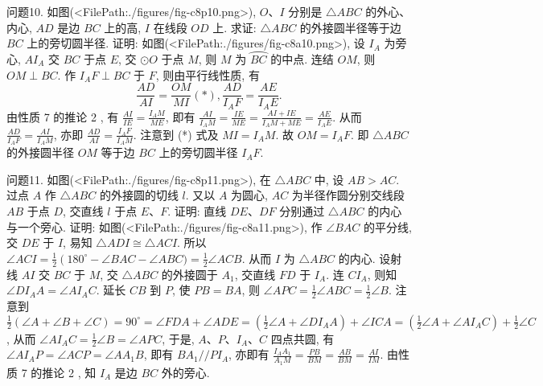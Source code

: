 问题10. 如图(<FilePath:./figures/fig-c8p10.png>), $O 、 I$ 分别是 $\triangle A B C$ 的外心、内心, $A D$ 是边 $B C$ 上的高, $I$ 在线段 $O D$ 上.
求证: $\triangle A B C$ 的外接圆半径等于边 $B C$ 上的旁切圆半径.
证明: 如图(<FilePath:./figures/fig-c8a10.png>), 设 $I_A$ 为旁心, $A I_A$ 交 $B C$ 于点 $E$, 交 $\odot O$ 于点 $M$, 则 $M$ 为 $\overparen{B C}$ 的中点.
连结 $O M$, 则 $O M \perp B C$. 作 $I_A F \perp B C$ 于 $F$, 则由平行线性质, 有
$$
\frac{A D}{A I}=\frac{O M}{M I}(*), \frac{A D}{I_A F}=\frac{A E}{I_A E} .
$$
由性质 7 的推论 2 , 有 $\frac{A I}{I E}=\frac{I_A M}{M E}$, 即有 $\frac{A I}{I_A M}=\frac{I E}{M E}= \frac{A I+I E}{I_A M+M E}=\frac{A E}{I_A E}$. 从而 $\frac{A D}{I_A F}=\frac{A I}{I_A M}$, 亦即 $\frac{A D}{A I}=\frac{I_A F}{I_A M}$. 
注意到 (*) 式及 $M I=I_A M$. 故 $O M=I_A F$. 即 $\triangle A B C$ 的外接圆半径 $O M$ 等于边 $B C$ 上的旁切圆半径 $I_A F$.



问题11. 如图(<FilePath:./figures/fig-c8p11.png>), 在 $\triangle A B C$ 中, 设 $A B>A C$. 过点 $A$ 作 $\triangle A B C$ 的外接圆的切线 $l$. 又以 $A$ 为圆心, $A C$ 为半径作圆分别交线段 $A B$ 于点 $D$, 交直线 $l$ 于点 $E 、 F$. 证明: 直线 $D E 、 D F$ 分别通过 $\triangle A B C$ 的内心与一个旁心.
证明: 如图(<FilePath:./figures/fig-c8a11.png>), 作 $\angle B A C$ 的平分线, 交 $D E$ 于 $I$, 易知 $\triangle A D I \cong \triangle A C I$. 所以 $\angle A C I=\frac{1}{2}\left(180^{\circ}-\angle B A C-\right. \angle A B C)=\frac{1}{2} \angle A C B$. 从而 $I$ 为 $\triangle A B C$ 的内心.
设射线 $A I$ 交 $B C$ 于 $M$, 交 $\triangle A B C$ 的外接圆于 $A_1$, 交直线 $F D$ 于 $I_A$. 连 $C I_A$, 则知 $\angle D I_A A=\angle A I_A C$.
延长 $C B$ 到 $P$, 使 $P B=B A$, 则 $\angle A P C= \frac{1}{2} \angle A B C=\frac{1}{2} \angle B$.
注意到 $\frac{1}{2}(\angle A+\angle B+\angle C)=90^{\circ}=\angle F D A+\angle A D E= \left(\frac{1}{2} \angle A+\angle D I_A A\right)+\angle I C A=\left(\frac{1}{2} \angle A+\angle A I_A C\right)+\frac{1}{2} \angle C$,
从而 $\angle A I_A C=\frac{1}{2} \angle B=\angle A P C$, 于是, $A 、 P 、 I_A 、 C$ 四点共圆, 有 $\angle A I_A P= \angle A C P=\angle A A_1 B$, 即有 $B A_1 / / P I_A$, 亦即有 $\frac{I_A A_1}{A_1 M}=\frac{P B}{B M}=\frac{A B}{B M}=\frac{A I}{I M}$.
由性质 7 的推论 2 , 知 $I_A$ 是边 $B C$ 外的旁心.



